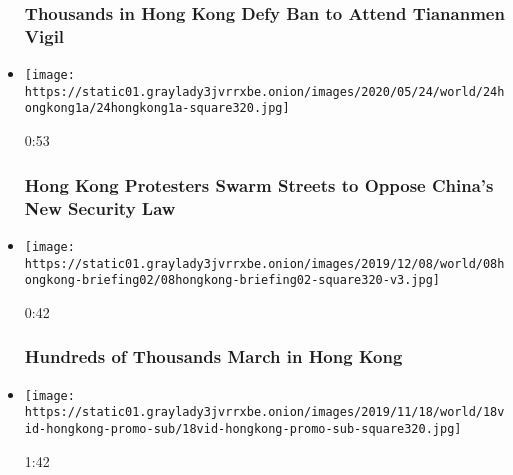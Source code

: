 \begin{itemize}
{  \subsubsection{Thousands in Hong Kong Defy Ban to Attend Tiananmen
  Vigil}\label{thousands-in-hong-kong-defy-ban-to-attend-tiananmen-vigil}}
\item
  \href{https://www.nytimes3xbfgragh.onion/video/world/asia/100000007154970/hong-kong-protests-security-legislation.html?action=click\&module=video-series-bar\&region=header\&pgtype=Article\&playlistId=video/hk-protest}{}

  \texttt{[image: https://static01.graylady3jvrrxbe.onion/images/2020/05/24/world/24hongkong1a/24hongkong1a-square320.jpg]}

  0:53

  \hypertarget{hong-kong-protesters-swarm-streets-to-oppose-chinas-new-security-law}{%
  \subsubsection{Hong Kong Protesters Swarm Streets to Oppose China's
  New Security
  Law}\label{hong-kong-protesters-swarm-streets-to-oppose-chinas-new-security-law}}
\item
  \href{https://www.nytimes3xbfgragh.onion/video/world/asia/100000006864463/hong-kong-protests-video.html?action=click\&module=video-series-bar\&region=header\&pgtype=Article\&playlistId=video/hk-protest}{}

  \texttt{[image: https://static01.graylady3jvrrxbe.onion/images/2019/12/08/world/08hongkong-briefing02/08hongkong-briefing02-square320-v3.jpg]}

  0:42

  \hypertarget{hundreds-of-thousands-march-in-hong-kong}{%
  \subsubsection{Hundreds of Thousands March in Hong
  Kong}\label{hundreds-of-thousands-march-in-hong-kong}}
\item
  \href{https://www.nytimes3xbfgragh.onion/video/world/asia/100000006830253/hong-kong-protests.html?action=click\&module=video-series-bar\&region=header\&pgtype=Article\&playlistId=video/hk-protest}{}

  \texttt{[image: https://static01.graylady3jvrrxbe.onion/images/2019/11/18/world/18vid-hongkong-promo-sub/18vid-hongkong-promo-sub-square320.jpg]}

  1:42


\end{itemize}
